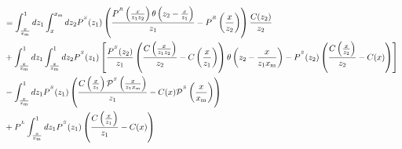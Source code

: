 \documentclass[a4paper]{article}
\newcommand{\PR}[0]{P^{^R}}
\newcommand{\PS}[0]{P^{^S}}
\newcommand{\PmS}[0]{\mathcal{P}^{^S}}
\newcommand{\PL}[0]{P^{^L}}
\newcommand{\xm}[0]{x_{\rm m}}
\newcommand{\zo}[0]{{z_1}}
\newcommand{\zt}[0]{{z_2}}
\begin{document}
\begin{equation*}
	\begin{split}
		&= \int_{\frac{x}{\xm}}^1dz_1 \int_x^{\xm}dz_2\PS(\zo)\left(\frac{\PR\left(\frac{x}{\zo \zt}\right)\theta\left(\zt-\frac{x}{\zo}\right)}{\zo} - \PR\left(\frac{x}{\zt} \right)\right)\frac{C(\zt)}{\zt} \\
		&+\int_{\frac{x}{\xm}}^1dz_1 \int_{\frac{x}{\xm}}^1dz_2 \PS(\zo) \left[ \frac{\PS(\zt)}{\zo}\left(\frac{C\left(\frac{x}{\zo \zt}\right)}{\zt}-C\left(\frac{x}{\zo}\right) \right)\theta\left(\zt - \frac{x}{\zo \xm}\right) - \PS(\zt)\left(\frac{C\left(\frac{x}{\zt}\right)}{\zt}-C(x) \right)\right] \\
		&- \int_\frac{x}{\xm}^1 d\zo\PS(\zo)\left(\frac{C\left(\frac{x}{\zo}\right)\PmS\left(\frac{x}{\zo \xm}\right)}{\zo} - C(x) \PmS\left(\frac{x}{\xm}\right) \right) \\
		&+\PL \int_\frac{x}{\xm}^1 d\zo \PS(\zo)\left(\frac{C\left(\frac{x}{\zo}\right)}{\zo}-C(x)\right)
	\end{split}
\end{equation*}
\end{document}
